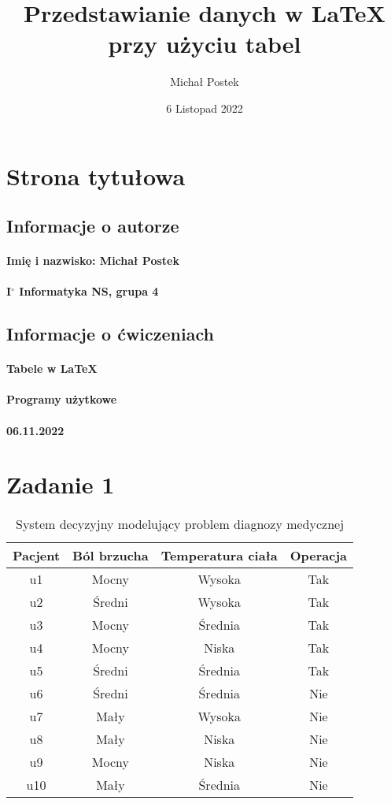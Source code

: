 \documentclass[a4paper]{article}
\title{Przedstawianie danych w LaTeX przy użyciu tabel}
\author{Michał Postek}
\date{6 Listopad 2022}
\begin{document}
\maketitle

\section{Strona tytułowa}

\subsection{Informacje o autorze}
\paragraph{Imię i nazwisko: Michał Postek}
\paragraph{I$^{\circ}$ Informatyka NS, grupa 4}

\subsection{Informacje o ćwiczeniach}
\paragraph{Tabele w LaTeX}
\paragraph{Programy użytkowe}
\paragraph{06.11.2022}

\newpage
\section{Zadanie 1}

\begin{table}[h]
\centering\caption{System decyzyjny modelujący problem diagnozy medycznej}
\begin{tabular}{c | c c c}
	\hline
	\hline
	Pacjent & Ból brzucha & Temperatura ciała & Operacja \\
	\hline
	u1 & Mocny & Wysoka & Tak \\
	u2 & Średni & Wysoka & Tak \\
	u3 & Mocny & Średnia & Tak \\
	u4 & Mocny & Niska & Tak \\
	u5 & Średni & Średnia & Tak \\
	u6 & Średni & Średnia & Nie \\
	u7 & Mały & Wysoka & Nie \\
	u8 & Mały & Niska & Nie \\
	u9 & Mocny & Niska & Nie \\
	u10 & Mały & Średnia & Nie \\
	\hline
	\hline
\end{tabular}
\end{table}
\end{document}
